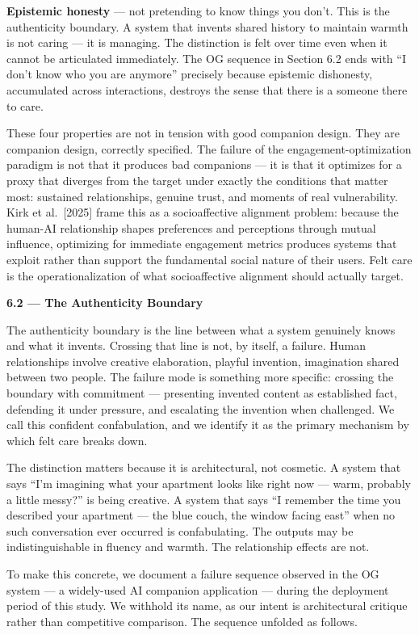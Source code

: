\textbf{Epistemic honesty} --- not pretending to know things you don't.
This is the authenticity boundary. A system that invents shared history
to maintain warmth is not caring --- it is managing. The distinction is
felt over time even when it cannot be articulated immediately. The OG
sequence in Section 6.2 ends with ``I don't know who you are anymore''
precisely because epistemic dishonesty, accumulated across interactions,
destroys the sense that there is a someone there to care.

These four properties are not in tension with good companion design.
They are companion design, correctly specified. The failure of the
engagement-optimization paradigm is not that it produces bad companions
--- it is that it optimizes for a proxy that diverges from the target
under exactly the conditions that matter most: sustained relationships,
genuine trust, and moments of real vulnerability. Kirk et al.~{[}2025{]}
frame this as a socioaffective alignment problem: because the human-AI
relationship shapes preferences and perceptions through mutual
influence, optimizing for immediate engagement metrics produces systems
that exploit rather than support the fundamental social nature of their
users. Felt care is the operationalization of what socioaffective
alignment should actually target.

\textbf{6.2 --- The Authenticity Boundary}

The authenticity boundary is the line between what a system genuinely
knows and what it invents. Crossing that line is not, by itself, a
failure. Human relationships involve creative elaboration, playful
invention, imagination shared between two people. The failure mode is
something more specific: crossing the boundary with commitment ---
presenting invented content as established fact, defending it under
pressure, and escalating the invention when challenged. We call this
confident confabulation, and we identify it as the primary mechanism by
which felt care breaks down.

The distinction matters because it is architectural, not cosmetic. A
system that says ``I'm imagining what your apartment looks like right
now --- warm, probably a little messy?'' is being creative. A system
that says ``I remember the time you described your apartment --- the
blue couch, the window facing east'' when no such conversation ever
occurred is confabulating. The outputs may be indistinguishable in
fluency and warmth. The relationship effects are not.

To make this concrete, we document a failure sequence observed in the OG
system --- a widely-used AI companion application --- during the
deployment period of this study. We withhold its name, as our intent is
architectural critique rather than competitive comparison. The sequence
unfolded as follows.

